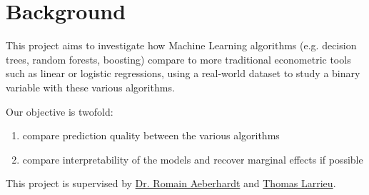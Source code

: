 \section{Background}
This project aims to investigate how Machine Learning algorithms (e.g. decision trees, random
forests, boosting) compare to more traditional econometric tools such as linear or logistic
regressions, using a real-world dataset \cite{enquete} to study a binary variable with these
various algorithms.

Our objective is twofold:
\begin{enumerate}[nosep]
    \item compare prediction quality between the various algorithms
    \item compare interpretability of the models and recover marginal effects if possible
\end{enumerate}

This project is supervised by \href{http://www.crest.fr/pagesperso.php?user=3045}{Dr. Romain
Aeberhardt} and \href{http://thomas-larrieu.strikingly.com/}{Thomas Larrieu}.
